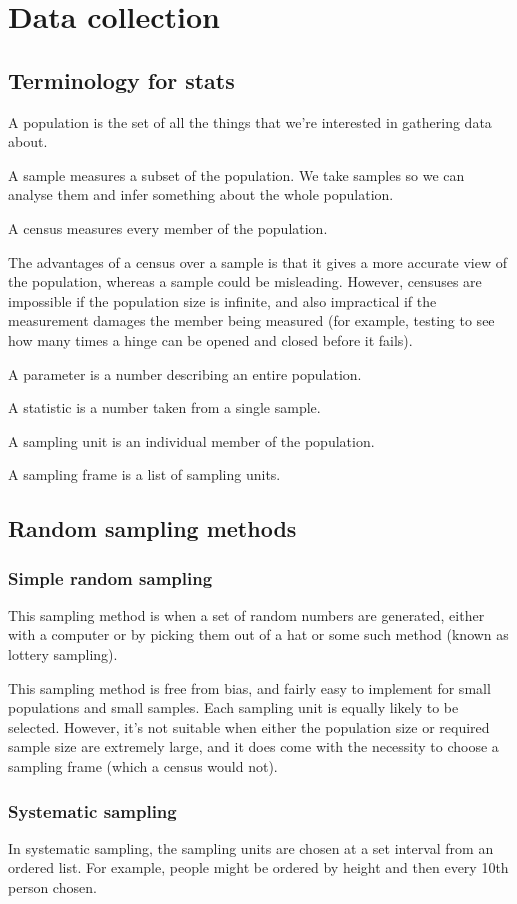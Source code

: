 \section{Data collection}
\subsection{Terminology for stats}
A population is the set of all the things that we're interested in gathering data about.

A sample measures a subset of the population. We take samples so we can analyse them and infer something about the whole population.

A census measures every member of the population.

The advantages of a census over a sample is that it gives a more accurate view of the population, whereas a sample could be misleading. However, censuses are impossible if the population size is infinite, and also impractical if the measurement damages the member being measured (for example, testing to see how many times a hinge can be opened and closed before it fails).

A parameter is a number describing an entire population.

A statistic is a number taken from a single sample.

A sampling unit is an individual member of the population.

A sampling frame is a list of sampling units.

\subsection{Random sampling methods}
\subsubsection{Simple random sampling}
This sampling method is when a set of random numbers are generated, either with a computer or by picking them out of a hat or some such method (known as lottery sampling).

This sampling method is free from bias, and fairly easy to implement for small populations and small samples. Each sampling unit is equally likely to be selected. However, it's not suitable when either the population size or required sample size are extremely large, and it does come with the necessity to choose a sampling frame (which a census would not).

\subsubsection{Systematic sampling}
In systematic sampling, the sampling units are chosen at a set interval from an ordered list. For example, people might be ordered by height and then every 10th person chosen.

